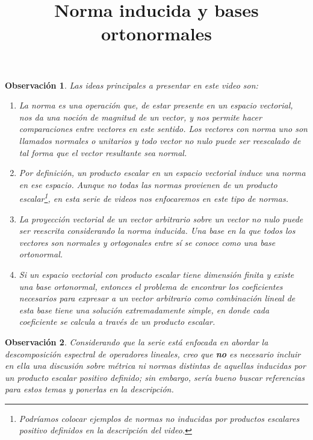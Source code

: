 \documentclass[12pt,dvipsnames]{article}
\newtheorem{obs}{Observación}[section]
\numberwithin{equation}{section}
\begin{document}
\title{Norma inducida y bases ortonormales}
\date{}
\maketitle

\begin{obs}
    Las ideas principales a presentar en este video son:

    \begin{enumerate}[label=(\roman*)]
        \item La norma es una operación que, de estar presente en un espacio vectorial, nos da una noción de \emph{magnitud} de un vector, y nos permite hacer comparaciones entre vectores en este sentido. Los vectores con norma uno son llamados \emph{normales} o \emph{unitarios} y todo vector no nulo puede ser reescalado de tal forma que el vector resultante sea normal.

        \item Por definición, un producto escalar en un espacio vectorial induce una norma en ese espacio. Aunque no todas las normas provienen de un producto escalar\footnote{Podríamos colocar ejemplos de normas no inducidas por productos escalares positivo definidos en la descripción del video.}, en esta serie de videos nos enfocaremos en este tipo de normas. 

        \item La proyección vectorial de un vector arbitrario sobre un vector no nulo puede ser reescrita considerando la norma inducida. Una base en la que todos los vectores son normales y ortogonales entre sí se conoce como una base ortonormal.

        \item Si un espacio vectorial con producto escalar tiene dimensión finita y existe una base ortonormal, entonces el problema de encontrar los coeficientes necesarios para expresar a un vector arbitrario como combinación lineal de esta base tiene una solución extremadamente simple, en donde cada coeficiente se calcula a través de un producto escalar.
    \end{enumerate}
\end{obs}

\begin{obs}
Considerando que la serie está enfocada en abordar la descomposición espectral de operadores lineales, creo que \textbf{no} es necesario incluir en ella una discusión sobre métrica ni normas distintas de aquellas inducidas por un producto escalar positivo definido; sin embargo, sería bueno buscar referencias para estos temas y ponerlas en la descripción.
\end{obs}
\end{document}
